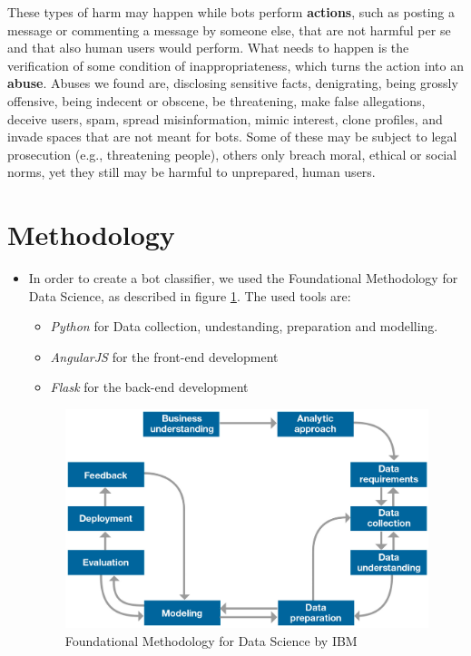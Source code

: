 These types of harm may happen while bots perform  \textbf{actions}, such as posting a message or commenting a message by someone else, that are not harmful per se and that also human users would perform. What needs to happen is the verification of some condition of inappropriateness, which turns the action into an \textbf{abuse}. Abuses we found are, disclosing sensitive facts, denigrating, being grossly offensive, being indecent or obscene, be threatening, make false allegations, deceive users, spam, spread misinformation, mimic interest, clone profiles, and invade spaces that are not meant for bots. Some of these may be subject to legal prosecution (e.g., threatening people), others only breach moral, ethical or social norms, yet they still may be harmful to unprepared, human users.


\section{Methodology}


\begin{itemize}
\item[\PencilRight] In order to create a bot classifier, we used the Foundational Methodology for Data Science, as described in figure \ref{fig:methodology}. The used tools are:

\begin{itemize}
	\item[\PencilRight] \emph{Python} for Data collection, undestanding, preparation and modelling.
	\item[\PencilRight] \emph{AngularJS} for the front-end development
	\item[\PencilRight] \emph{Flask} for the back-end development
\end{itemize}

\begin{figure}
	\includegraphics[width=\linewidth]{chapter1/figure/methodology.jpg}
	\caption{Foundational Methodology for Data Science by IBM}
	\label{fig:methodology}
\end{figure}

\end{itemize}



